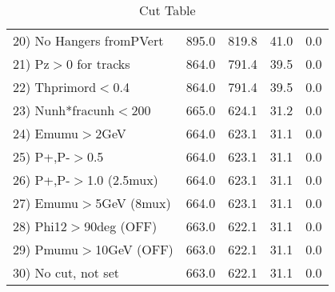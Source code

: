 \begin{table}[h!]
\begin{tabular}{||l||r|r|r|r||}
 20) No Hangers fromPVert &       895.0 &       819.8 &        41.0 &         0.0 \\
 21) Pz$>$0 for tracks    &       864.0 &       791.4 &        39.5 &         0.0 \\
 22) Thprimord$<$0.4      &       864.0 &       791.4 &        39.5 &         0.0 \\
 23) Nunh*fracunh$<$200   &       665.0 &       624.1 &        31.2 &         0.0 \\
 24) Emumu$>$2GeV         &       664.0 &       623.1 &        31.1 &         0.0 \\
 25) P+,P-$>$0.5          &       664.0 &       623.1 &        31.1 &         0.0 \\
 26) P+,P-$>$1.0 (2.5mux) &       664.0 &       623.1 &        31.1 &         0.0 \\
 27) Emumu$>$5GeV  (8mux) &       664.0 &       623.1 &        31.1 &         0.0 \\
 28) Phi12$>$90deg  (OFF) &       663.0 &       622.1 &        31.1 &         0.0 \\
 29) Pmumu$>$10GeV  (OFF) &       663.0 &       622.1 &        31.1 &         0.0 \\
 30) No cut, not set      &       663.0 &       622.1 &        31.1 &         0.0 \\
 \hline
 \hline
 \end{tabular}
 \caption{Cut Table \cohrp  }
 \label{tab-cut_crhop}
 \end{table}
